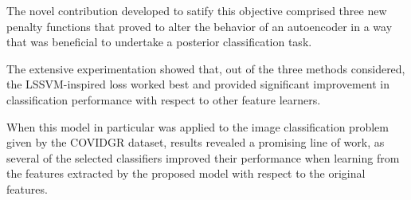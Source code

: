 The novel contribution developed to satify this objective comprised three new penalty functions that proved to alter the behavior of an autoencoder in a way that was beneficial to undertake a posterior classification task.

The extensive experimentation showed that, out of the three methods considered, the LSSVM-inspired loss worked best and provided significant improvement in classification performance with respect to other feature learners.


When this model in particular was applied to the image classification problem given by the COVIDGR dataset, results revealed a promising line of work, as several of the selected classifiers improved their performance when learning from the features extracted by the proposed model with respect to the original features.









